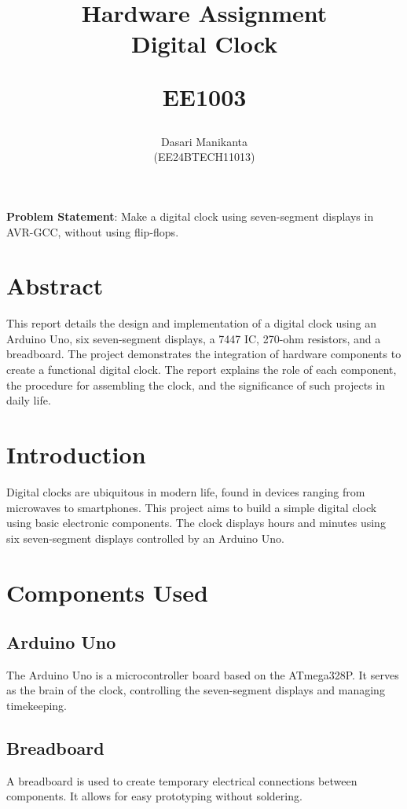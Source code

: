 \documentclass[journal]{IEEEtran}
\begin{document}
\title{
Hardware Assignment \\ Digital Clock

\large{EE1003}
}

\author{Dasari Manikanta \\(EE24BTECH11013)}

\maketitle

\bigskip

\textbf{Problem Statement}: Make a digital clock using seven-segment displays in AVR-GCC, without using flip-flops.



\section*{Abstract}
This report details the design and implementation of a digital clock using an Arduino Uno, six seven-segment displays, a 7447 IC, 270-ohm resistors, and a breadboard. The project demonstrates the integration of hardware components to create a functional digital clock. The report explains the role of each component, the procedure for assembling the clock, and the significance of such projects in daily life.

\section{Introduction}
Digital clocks are ubiquitous in modern life, found in devices ranging from microwaves to smartphones. This project aims to build a simple digital clock using basic electronic components. The clock displays hours and minutes using six seven-segment displays controlled by an Arduino Uno.

\section{Components Used}
\subsection{Arduino Uno}
The Arduino Uno is a microcontroller board based on the ATmega328P. It serves as the brain of the clock, controlling the seven-segment displays and managing timekeeping.

\subsection{Breadboard}
A breadboard is used to create temporary electrical connections between components. It allows for easy prototyping without soldering.
\end{document}
